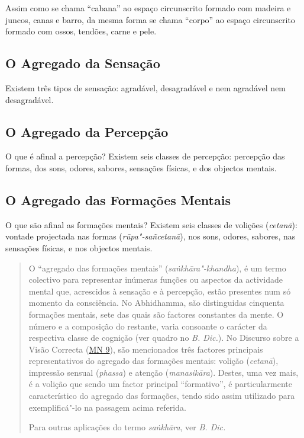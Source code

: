 Assim como se chama “cabana” ao espaço circunscrito formado com madeira e
juncos, canas e barro, da mesma forma se chama “corpo” ao espaço circunscrito
formado com ossos, tendões, carne e pele.


\subsection{O Agregado da Sensação}


Existem três tipos de sensação: agradável, desagradável e nem agradável nem
desagradável.


\subsection{O Agregado da Percepção}


O que é afinal a percepção? Existem seis classes de percepção: percepção das
formas, dos sons, odores, sabores, sensações físicas, e dos objectos mentais.

\subsection{O Agregado das Formações Mentais}


O que são afinal as formações mentais? Existem seis classes de volições
(\emph{cetanā}): vontade projectada nas formas (\emph{rūpa"-sañcetanā}), nos
sons, odores, sabores, nas sensações físicas, e nos objectos mentais.


\clearpage

\begin{quote}
  O “agregado das formações mentais” (\emph{sa\.{n}khāra"-khandha}), é um termo
  colectivo para representar inúmeras funções ou aspectos da actividade mental
  que, acrescidos à sensação e à percepção, estão presentes num só momento da
  consciência. No Abhidhamma, são distinguidas cinquenta formações mentais, sete
  das quais são factores constantes da mente. O número e a composição do
  restante, varia consoante o carácter da respectiva classe de cognição (ver
  quadro no \emph{B. Dic.}). No Discurso sobre a Visão Correcta (\href{https://suttacentral.net/mn9/en/bodhi}{MN 9}),
  são mencionados três factores principais representativos do agregado das
  formações mentais: volição (\emph{cetanā}), impressão sensual (\emph{phassa})
  e atenção (\emph{manasikāra}). Destes, uma vez mais, é a volição que sendo um
  factor principal “formativo”, é particularmente característico do agregado
  das formações, tendo sido assim utilizado para exemplificá"-lo na passagem
  acima referida.

  Para outras aplicações do termo \emph{sa\.{n}khāra}, ver \emph{B. Dic.}
\end{quote}

